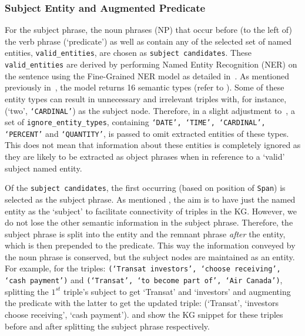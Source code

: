 \subsubsection{Subject Entity and Augmented Predicate}
For the subject phrase, the noun phrases (NP) that occur before (to the left of) the verb phrase (`predicate') as well as contain any of the selected set of named entities, \texttt{valid\_entities}, are chosen as \texttt{subject candidates}. These \texttt{valid\_entities} are derived by performing Named Entity Recognition (NER) on the sentence using the Fine-Grained NER model as detailed in~. As mentioned previously in~, the model returns 16 semantic types (refer to ). Some of these entity types can result in unnecessary and irrelevant triples with, for instance, (`two', \texttt{`CARDINAL'}) as the subject node. Therefore, in a slight adjustment to~, a set of \texttt{ignore\_entity\_types}, containing \texttt{`DATE', `TIME', `CARDINAL', `PERCENT'} and \texttt{`QUANTITY'}, is passed to omit extracted entities of these types. This does not mean that information about these entities is completely ignored as they are likely to be extracted as object phrases when in reference to a `valid' subject named entity. 

Of the \texttt{subject candidates}, the first occurring (based on position of \texttt{Span}) is selected as the subject phrase. As mentioned , the aim is to have just the named entity as the `subject' to facilitate connectivity of triples in the KG. However, we do not lose the other semantic information in the subject phrase. Therefore, the subject phrase is split into the entity and the remnant phrase \textit{after} the entity, which is then prepended to the predicate. This way the information conveyed by the noun phrase is conserved, but the subject nodes are maintained as an entity. For example, for the triples: \texttt{(`Transat investors', `choose receiving', `cash payment')} and \texttt{(`Transat', `to become part of', `Air Canada')}, splitting the $1^{st}$ triple's subject to get `Transat' and `investors' and augmenting the predicate with the latter to get the updated triple: (`Transat', `investors choose receiving', `cash payment').  and  show the KG snippet for these triples before and after splitting the subject phrase respectively.
  
